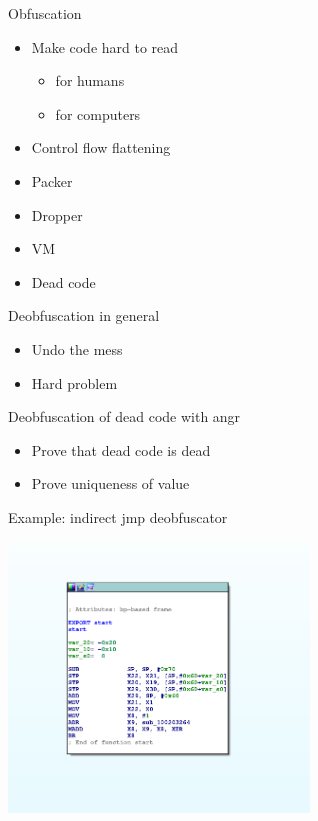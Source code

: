 \documentclass[10pt, compress]{beamer}
\begin{document}
\begin{frame}{Obfuscation}
  \begin{itemize}
    \item Make code hard to read
    \begin{itemize}
      \item for humans
      \item for computers
    \end{itemize}
    \item Control flow flattening
    \item Packer
    \item Dropper
    \item VM
    \item Dead code
  \end{itemize}
\end{frame}

\begin{frame}{Deobfuscation in general}
  \begin{itemize}
    \item Undo the mess
    \item Hard problem
  \end{itemize}
\end{frame}

\begin{frame}{Deobfuscation of dead code with angr}
  \begin{itemize}
    \item Prove that dead code is dead
    \item Prove uniqueness of value
  \end{itemize}
\end{frame}

\begin{frame}{Example: indirect jmp deobfuscator}
\begin{center}
  \includegraphics[width=0.6\textwidth]{images/deobf-1-ida1.png}
 \end{center}
\end{frame}
\end{document}
